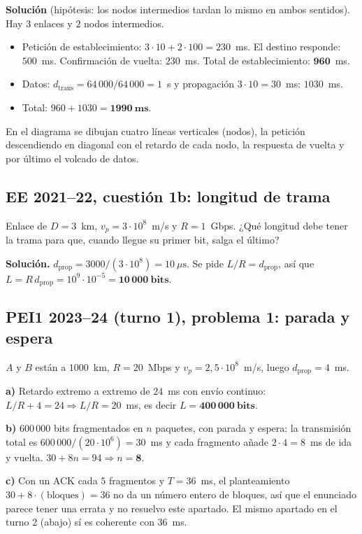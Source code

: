 \documentclass[11pt,a4paper]{article}
\begin{document}
\textbf{Solución} (hipótesis: los nodos intermedios tardan lo mismo en ambos sentidos). Hay $3$ enlaces y $2$ nodos intermedios.
\begin{itemize}
  \item Petición de establecimiento: $3\cdot10+2\cdot100=230$~ms. El destino responde: $500$~ms. Confirmación de vuelta: $230$~ms. Total de establecimiento: $\mathbf{960}$~ms.
  \item Datos: $d_{\text{trans}}=64\,000/64\,000=1$~s y propagación $3\cdot10=30$~ms: $1030$~ms.
  \item Total: $960+1030=\mathbf{1990~ms}$.
\end{itemize}
En el diagrama se dibujan cuatro líneas verticales (nodos), la petición descendiendo en diagonal con el retardo de cada nodo, la respuesta de vuelta y por último el volcado de datos.

\subsection*{EE 2021--22, cuestión 1b: longitud de trama}
Enlace de $D=3$~km, $v_p=3\cdot10^{8}$~m/s y $R=1$~Gbps. ¿Qué longitud debe tener la trama para que, cuando llegue su primer bit, salga el último?

\textbf{Solución.} $d_{\text{prop}}=3000/(3\cdot10^{8})=10~\mu\text{s}$. Se pide $L/R=d_{\text{prop}}$, así que $L=R\,d_{\text{prop}}=10^{9}\cdot10^{-5}=\mathbf{10\,000~bits}$.

\subsection*{PEI1 2023--24 (turno 1), problema 1: parada y espera}
$A$ y $B$ están a $1000$~km, $R=20$~Mbps y $v_p=2{,}5\cdot10^{8}$~m/s, luego $d_{\text{prop}}=4$~ms.

\textbf{a)} Retardo extremo a extremo de $24$~ms con envío continuo: $L/R+4=24\Rightarrow L/R=20$~ms, es decir $L=\mathbf{400\,000~bits}$.

\textbf{b)} $600\,000$ bits fragmentados en $n$ paquetes, con parada y espera: la transmisión total es $600\,000/(20\cdot10^{6})=30$~ms y cada fragmento añade $2\cdot4=8$~ms de ida y vuelta. $30+8n=94\Rightarrow n=\mathbf{8}$.

\textbf{c)} Con un ACK cada $5$ fragmentos y $T=36$~ms, el planteamiento $30+8\cdot(\text{bloques})=36$ no da un número entero de bloques, así que el enunciado parece tener una errata y no resuelvo este apartado. El mismo apartado en el turno 2 (abajo) sí es coherente con $36$~ms.
\end{document}
